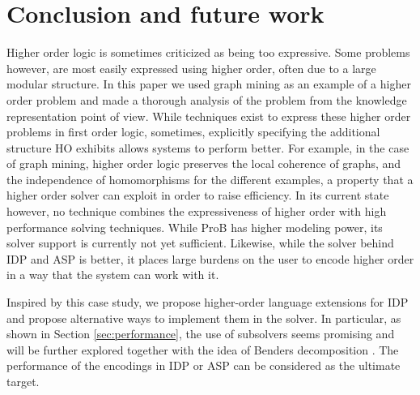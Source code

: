\section{Conclusion and future work}
\label{sec:conclusion}
Higher order logic is sometimes criticized as being too expressive. Some problems however, are most easily expressed using higher order, often due to a large modular structure. In this paper we used graph mining as an example of a higher order problem and made a thorough analysis of the problem from the knowledge representation point of view. While techniques exist to express these higher order problems in first order logic, sometimes, explicitly specifying the additional structure HO exhibits allows systems to perform better. For example, in the case of graph mining, higher order logic preserves the local coherence of graphs, and the independence of homomorphisms for the different examples, a property that a higher order solver can exploit in order to raise efficiency. In its current state however, no technique combines the expressiveness of higher order with high performance solving techniques. While ProB has higher modeling power, its solver support is currently not yet sufficient. Likewise, while the solver behind IDP and ASP is better, it places large burdens on the user to encode higher order in a way that the system can work with it.

        Inspired by this case study, we propose higher-order language extensions for IDP and propose alternative ways to implement them in the solver. In particular, as shown in Section \ref{sec:performance}, the use of subsolvers seems promising and will be further explored together with the idea of Benders decomposition \citep{Benders}. The performance of the encodings in IDP or ASP can be considered as the ultimate target. 
